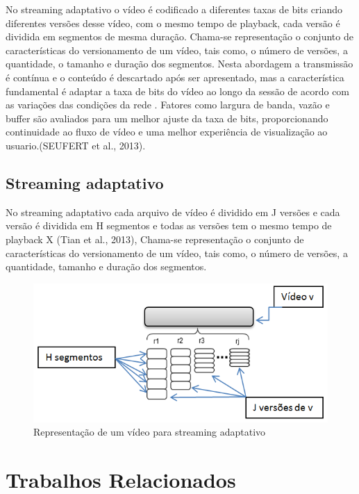 \documentclass[
	12pt,
	oneside,
	a4paper,
	english,
	brazil
	]{abntex2ppgsi}
\begin{document}
No streaming adaptativo o vídeo é codificado a diferentes taxas de bits  criando diferentes versões desse vídeo, com o mesmo tempo de playback, cada versão é dividida em segmentos de mesma duração. Chama-se representação o conjunto de características do versionamento de um vídeo, tais como, o número de versões, a quantidade, o tamanho e duração dos segmentos. Nesta abordagem a transmissão é contínua e o conteúdo é descartado após ser apresentado, mas a característica fundamental é adaptar a taxa de bits do vídeo ao longo da sessão de acordo com as variações das condições da rede . Fatores como largura de banda, vazão e buffer são avaliados para um melhor ajuste da taxa de bits, proporcionando continuidade ao fluxo de vídeo e uma melhor experiência de visualização ao usuario.(SEUFERT et al., 2013).

\section{Streaming adaptativo}
No streaming adaptativo cada arquivo de vídeo é dividido em J versões e cada versão é dividida em H segmentos e todas as versões tem o mesmo tempo de playback X (Tian et al., 2013), Chama-se representação o conjunto de características do versionamento de um vídeo, tais como, o número de versões, a quantidade, tamanho e duração dos segmentos.

\begin{figure}[H]%
	\centering
 	  \caption{Representação de um vídeo para streaming adaptativo}
		\includegraphics{figuras/segmentos.png}
\end{figure}



\chapter{Trabalhos Relacionados}
\end{document}
